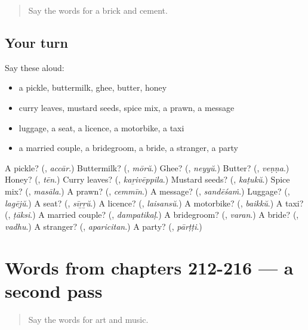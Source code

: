 \begin{quote}
Say the words for a brick and cement.
\end{quote}

\subsection*{Your turn}
Say these aloud:

\begin{itemize}
\raggedright
  \item a pickle, buttermilk, ghee, butter, honey
  \item curry leaves, mustard seeds, spice mix, a prawn, a message
  \item luggage, a seat, a licence, a motorbike, a taxi
  \item a married couple, a bridegroom, a bride, a stranger, a party
\end{itemize}

\begin{tcolorbox}[breakable,colback=teal!4,colframe=teal!35!black,title={Before you move on}]
A pickle? (\textbf{}, \emph{accār}.) Buttermilk? (\textbf{}, \emph{mōrŭ}.) Ghee? (\textbf{}, \emph{neyyŭ}.) Butter? (\textbf{}, \emph{veṇṇa}.) Honey? (\textbf{}, \emph{tēn}.) Curry leaves? (\textbf{}, \emph{kaṟivēppila}.) Mustard seeds? (\textbf{}, \emph{kaṭukŭ}.) Spice mix? (\textbf{}, \emph{masāla}.) A prawn? (\textbf{}, \emph{cemmīn}.) A message? (\textbf{}, \emph{sandēśaṁ}.) Luggage? (\textbf{}, \emph{lagējŭ}.) A seat? (\textbf{}, \emph{sīṟṟŭ}.) A licence? (\textbf{}, \emph{laisansŭ}.) A motorbike? (\textbf{}, \emph{baikkŭ}.) A taxi? (\textbf{}, \emph{ṭāksi}.) A married couple? (\textbf{}, \emph{dampatikaḷ}.) A bridegroom? (\textbf{}, \emph{varan}.) A bride? (\textbf{}, \emph{vadhu}.) A stranger? (\textbf{}, \emph{aparicitan}.) A party? (\textbf{}, \emph{pārṭṭi}.)
\end{tcolorbox}
\section[(dialogue)]{Words from chapters 212-216 — a second pass}

\label{lesson:ML-R216-second-pass-words-from-chapters-212-216}



\begin{quote}
Say the words for art and music.
\end{quote}

